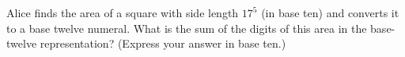 Alice finds the area of a square with side length $17^5$ (in base ten) and converts it to a base twelve numeral. What is the sum of the digits of this area in the base-twelve representation? (Express your answer in base ten.)
